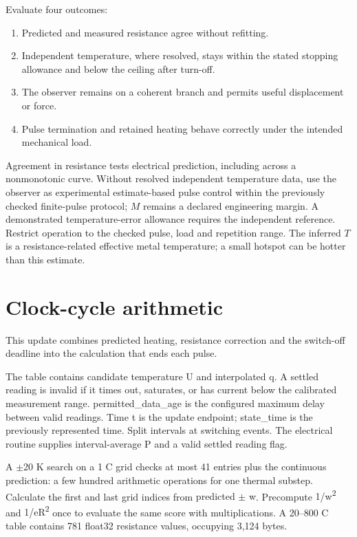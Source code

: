\documentclass[11pt,letterpaper]{article}
\begin{document}
Evaluate four outcomes:

\begin{enumerate}[start=1]
\item Predicted and measured resistance agree without refitting.
\item Independent temperature, where resolved, stays within the stated stopping allowance and below the ceiling after turn-off.
\item The observer remains on a coherent branch and permits useful displacement or force.
\item Pulse termination and retained heating behave correctly under the intended mechanical load.
\end{enumerate}

Agreement in resistance tests electrical prediction, including across a nonmonotonic curve. Without resolved independent temperature data, use the observer as experimental estimate-based pulse control within the previously checked finite-pulse protocol; \(M\) remains a declared engineering margin. A demonstrated temperature-error allowance requires the independent reference. Restrict operation to the checked pulse, load and repetition range. The inferred \(T\) is a resistance-related effective metal temperature; a small hotspot can be hotter than this estimate.

\appendix
{}
\section{Clock-cycle arithmetic}

This update combines predicted heating, resistance correction and the switch-off deadline into the calculation that ends each pulse.

The table contains candidate temperature \textsf{U} and interpolated \textsf{q}. A settled reading is invalid if it times out, saturates, or has current below the calibrated measurement range. \textsf{permitted\_\allowbreak{}data\_\allowbreak{}age} is the configured maximum delay between valid readings. Time \textsf{t} is the update endpoint; \textsf{state\_\allowbreak{}time} is the previously represented time. Split intervals at switching events. The electrical routine supplies interval-average \textsf{P} and a valid settled reading flag.

A \ensuremath{\pm}20 K search on a 1 \textdegree{}C grid checks at most 41 entries plus the continuous prediction: a few hundred arithmetic operations for one thermal substep. Calculate the first and last grid indices from \textsf{predicted \ensuremath{\pm} w}. Precompute \textsf{1/w\textsuperscript{2}} and \textsf{1/eR\textsuperscript{2}} once to evaluate the same score with multiplications. A 20--800 \textdegree{}C table contains 781 float32 resistance values, occupying 3,124 bytes.
\end{document}
